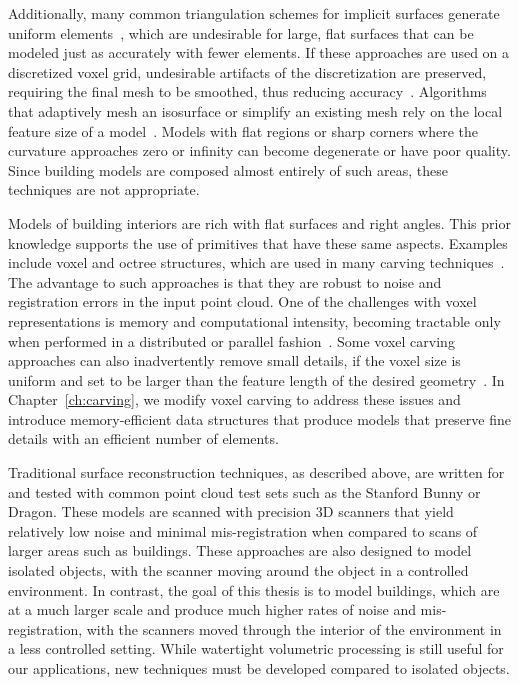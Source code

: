 \documentclass[12pt,onecolumn,oneside]{book}
\begin{document}
Additionally, many common triangulation schemes for implicit surfaces generate uniform elements~\cite{DualContouring,MarchingCubes}, which are undesirable for large, flat surfaces that can be modeled just as accurately with fewer elements.  If these approaches are used on a discretized voxel grid, undesirable artifacts of the discretization are preserved, requiring the final mesh to be smoothed, thus reducing accuracy~\cite{Carving}.  Algorithms that adaptively mesh an isosurface or simplify an existing mesh rely on the local feature size of a model~\cite{QEM,ProgressiveMesh,Isostuffing,AdaptiveMeshing}.  Models with flat regions or sharp corners where the curvature approaches zero or infinity can become degenerate or have poor quality.  Since building models are composed almost entirely of such areas, these techniques are not appropriate.

Models of building interiors are rich with flat surfaces and right angles.  This prior knowledge supports the use of primitives that have these same aspects.  Examples include voxel and octree structures, which are used in many carving techniques~\cite{OctreeSculpting,Carving,SpaceTime,VoxelSurfaceArea,Yang05}.  The advantage to such approaches is that they are robust to noise and registration errors in the input point cloud.  One of the challenges with voxel representations is memory and computational intensity, becoming tractable only when performed in a distributed or parallel fashion~\cite{ParallelOctree}.  Some voxel carving approaches can also inadvertently remove small details, if the voxel size is uniform and set to be larger than the feature length of the desired geometry~\cite{Carving}.  In Chapter~\ref{ch:carving}, we modify voxel carving to address these issues and introduce memory-efficient data structures that produce models that preserve fine details with an efficient number of elements.

Traditional surface reconstruction techniques, as described above, are written for and tested with common point cloud test sets such as the Stanford Bunny or Dragon.  These models are scanned with precision 3D scanners that yield relatively low noise and minimal mis-registration when compared to scans of larger areas such as buildings.  These approaches are also designed to model isolated objects, with the scanner moving around the object in a controlled environment.  In contrast, the goal of this thesis is to model buildings, which are at a much larger scale and produce much higher rates of noise and mis-registration, with the scanners moved through the interior of the environment in a less controlled setting.  While watertight volumetric processing is still useful for our applications, new techniques must be developed compared to isolated objects.
\end{document}

